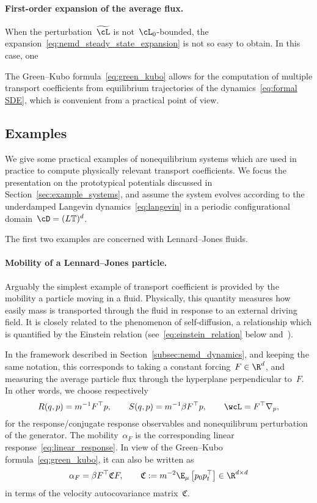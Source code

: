 \paragraph{First-order expansion of the average flux.}
When the perturbation~$\widetilde\cL$ is not~$\cL_0$-bounded, the expansion~\eqref{eq:nemd_steady_state_expansion} is not so easy to obtain. In this case, one

The Green--Kubo formula~\eqref{eq:green_kubo} allows for the computation of multiple transport coefficients from equilibrium trajectories of the dynamics~\eqref{eq:formal SDE}, which is convenient from a practical point of view.

\subsection{Examples}
\label{subsec:transport_coefficient_examples}
We give some practical examples of nonequilibrium systems which are used in practice to compute physically relevant transport coefficients. We focus the presentation on the prototypical potentials discussed in Section~\ref{sec:example_systems}, and assume the system evolves according to the underdamped Langevin dynamics~\eqref{eq:langevin} in a periodic configurational domain~$\cD = (L\mathbb T)^d$.

The first two examples are concerned with Lennard--Jones fluids.

\paragraph{Mobility of a Lennard--Jones particle.} Arguably the simplest example of transport coefficient is provided by the mobility a particle moving in a fluid. Physically, this quantity measures how easily mass is transported through the fluid in response to an external driving field. It is closely related to the phenomenon of self-diffusion, a relationship which is quantified by the Einstein relation (see~\ref{eq:einstein_relation} below and~\cite{rodenhausen1989}).

In the framework described in Section~\ref{subsec:nemd_dynamics}, and keeping the same notation, this corresponds to taking a constant forcing~$F\in\R^d$, and measuring the average particle flux through the hyperplane perpendicular to~$F$. In other words, we choose respectively
\begin{equation}
    R(q,p)=m^{-1}F^\top p,\qquad S(q,p) = m^{-1}\beta F^\top p,\qquad \wcL = F^\top\nabla_p,
\end{equation}
for the response/conjugate response observables and nonequilibrum perturbation of the generator. The mobility~$\alpha_F$ is the corresponding linear response~\eqref{eq:linear_response}.
In view of the Green--Kubo formula~\eqref{eq:green_kubo}, it can also be written as
\begin{equation}
    \alpha_F = \beta F^\top \mathfrak{C}F,\qquad\mathfrak{C} := m^{-2}\E_{\mu}\left[p_0p_t^\top\right]\in \R^{d\times d}
\end{equation}
in terms of the velocity autocovariance matrix~$\mathfrak{C}$.

